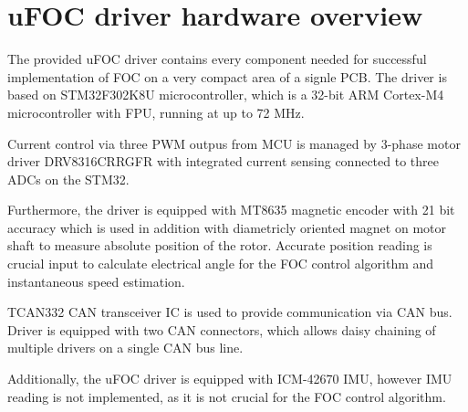 \chapter{uFOC driver hardware overview}
The provided uFOC driver contains every component needed for successful implementation of FOC on a very compact area of a signle PCB.
The driver is based on STM32F302K8U microcontroller, which is a 32-bit ARM Cortex-M4 microcontroller with FPU, running at up to 72 MHz.

Current control via three PWM outpus from MCU is managed by 3-phase motor driver DRV8316CRRGFR with integrated current sensing connected to three ADCs on the STM32.

Furthermore, the driver is equipped with MT8635 magnetic encoder with 21 bit accuracy which is used in addition with 
diametricly oriented magnet on motor shaft to measure absolute position of the rotor. 
Accurate position reading is crucial input to calculate electrical angle for the FOC control algorithm and instantaneous speed estimation.

TCAN332 CAN transceiver IC is used to provide communication via CAN bus. Driver is equipped with two CAN connectors, which allows daisy chaining of multiple drivers on a single CAN bus line.

Additionally, the uFOC driver is equipped with ICM-42670 IMU, however IMU reading is not implemented, as it is not crucial for the FOC control algorithm.

